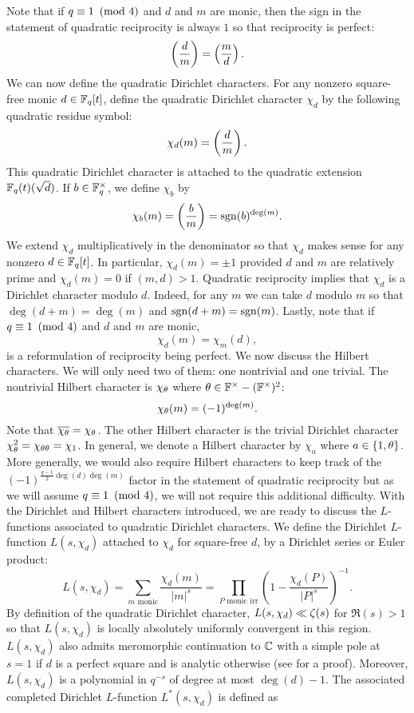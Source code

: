 \documentclass[12pt,reqno,oneside]{amsart}
\begin{document}
    Note that if $q \equiv 1 \ \left(\text{mod }4\right)$ and $d$ and $m$ are monic, then the sign in the statement of quadratic reciprocity is always $1$ so that reciprocity is perfect:
    \[
        \left(\frac{d}{m}\right) = \left(\frac{m}{d}\right).
    \]
    We can now define the quadratic Dirichlet characters. For any nonzero square-free monic $d \in \mathbb{F}_{q}[t]$, define the quadratic Dirichlet character $\chi_{d}$ by the following quadratic residue symbol:
    \[
        \chi_{d}(m) = \left(\frac{d}{m}\right).
    \]
    This quadratic Dirichlet character is attached to the quadratic extension $\mathbb{F}_{q}(t)(\sqrt{d})$. If $b \in \mathbb{F}_{q}^{\times}$, we define $\chi_{b}$ by
    \[
        \chi_{b}(m) = \left(\frac{b}{m}\right) = \operatorname{\mathrm{sgn}}(b)^{\deg(m)}.
    \]
    We extend $\chi_{d}$ multiplicatively in the denominator so that $\chi_{d}$ makes sense for any nonzero $d \in \mathbb{F}_{q}[t]$. In particular, $\chi_{d}(m) = \pm1$ provided $d$ and $m$ are relatively prime and $\chi_{d}(m) = 0$ if $(m,d) > 1$. Quadratic reciprocity implies that $\chi_{d}$ is a Dirichlet character modulo $d$. Indeed, for any $m$ we can take $d$ modulo $m$ so that $\deg(d+m) = \deg(m)$ and $\operatorname{\mathrm{sgn}}(d+m) = \operatorname{\mathrm{sgn}}(m)$. Lastly, note that if $q \equiv 1 \ \left(\text{mod }4\right)$ and $d$ and $m$ are monic,
    \[
        \chi_{d}(m) = \chi_{m}(d),
    \]
    is a reformulation of reciprocity being perfect. We now discuss the Hilbert characters. We will only need two of them: one nontrivial and one trivial. The nontrivial Hilbert character is $\chi_{\theta}$ where $\theta \in \mathbb{F}^{\times}-(\mathbb{F}^{\times})^{2}$:
    \[
        \chi_{\theta}(m) = (-1)^{\deg(m)}.
    \]
    Note that $\overline{\chi_{\theta}} = \chi_{\theta}$. The other Hilbert character is the trivial Dirichlet character $\chi_{\theta}^{2} = \chi_{\theta\theta} = \chi_{1}$. In general, we denote a Hilbert character by $\chi_{a}$ where $a \in \{1,\theta\}$. More generally, we would also require Hilbert characters to keep track of the $(-1)^{\frac{q-1}{2}\deg(d)\deg(m)}$ factor in the statement of quadratic reciprocity but as we will assume $q \equiv 1 \ \left(\text{mod }4\right)$, we will not require this additional difficulty. With the Dirichlet and Hilbert characters introduced, we are ready to discuss the $L$-functions associated to quadratic Dirichlet characters. We define the Dirichlet $L$-function $L(s,\chi_{d})$ attached to $\chi_{d}$ for square-free $d$, by a Dirichlet series or Euler product:
    \[
        L(s,\chi_{d}) = \sum_{\text{$m$ monic}}\frac{\chi_{d}(m)}{|m|^{s}} = \prod_{\text{$P$ monic irr}}\left(1-\frac{\chi_{d}(P)}{|P|^{s}}\right)^{-1}.
    \]
    By definition of the quadratic Dirichlet character, $L(s,\chi_{d}) \ll \zeta(s)$ for $\Re(s) > 1$ so that $L(s,\chi_{d})$ is locally absolutely uniformly convergent in this region. $L(s,\chi_{d})$ also admits meromorphic continuation to $\mathbb{C}$ with a simple pole at $s = 1$ if $d$ is a perfect square and is analytic otherwise (see \cite{rosen2002number} for a proof). Moreover, $L(s,\chi_{d})$ is a polynomial in $q^{-s}$ of degree at most $\deg(d)-1$. The associated completed Dirichlet $L$-function $L^{\ast}(s,\chi_{d})$ is defined as
\end{document}
